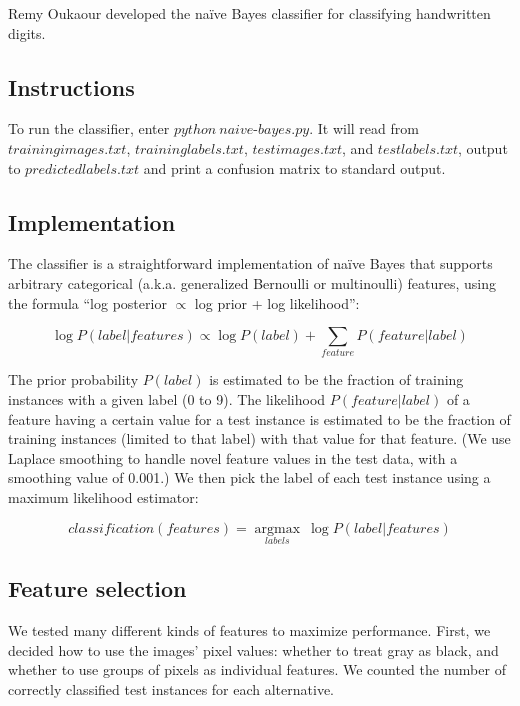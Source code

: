 \documentclass[11pt]{article}
\begin{document}
Remy Oukaour developed the na{\"i}ve Bayes classifier for classifying handwritten
digits.

\subsection{Instructions}

To run the classifier, enter $python\ naive\text{-}bayes.py$. It will read from
$trainingimages.txt$, $traininglabels.txt$, $testimages.txt$, and $testlabels.txt$,
output to $predictedlabels.txt$ and print a confusion matrix to standard output.

\subsection{Implementation}

The classifier is a straightforward implementation of na{\"i}ve Bayes that supports
arbitrary categorical (a.k.a. generalized Bernoulli or multinoulli) features, using
the formula ``log posterior $\propto$ log prior + log likelihood'':

$$\log P(label|features) \propto \log P(label) + \sum_{feature} P(feature|label)$$

The prior probability $P(label)$ is estimated to be the fraction of training instances
with a given label (0 to 9). The likelihood $P(feature|label)$ of a feature having a
certain value for a test instance is estimated to be the fraction of training instances
(limited to that label) with that value for that feature. (We use Laplace smoothing to
handle novel feature values in the test data, with a smoothing value of 0.001.) We then
pick the label of each test instance using a maximum likelihood estimator:

$$classification(features) = \underset{labels}{\operatorname{argmax}} \ \log P(label|features)$$

\subsection{Feature selection}

We tested many different kinds of features to maximize performance. First, we decided
how to use the images' pixel values: whether to treat gray as black, and whether to use
groups of pixels as individual features. We counted the number of correctly classified
test instances for each alternative.
\end{document}
